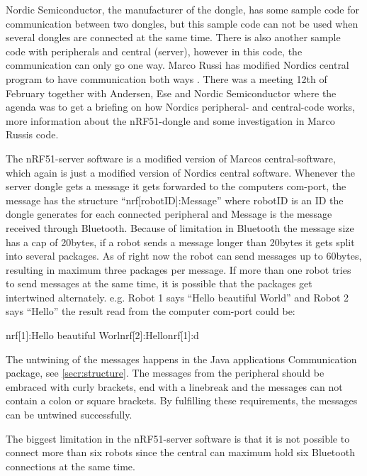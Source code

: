 Nordic Semiconductor, the manufacturer of the dongle, has some sample code for communication between two dongles, but this sample code can not be used when several dongles are connected at the same time. There is also another sample code with peripherals and central (server), however in this code, the communication can only go one way. Marco Russi has modified Nordics central program to have communication both ways \cite{marcoRussi}. There was a meeting 12th of February together with Andersen, Ese and Nordic Semiconductor where the agenda was to get a briefing on how Nordics peripheral- and central-code works, more information about the nRF51-dongle and some investigation in Marco Russis code.

The nRF51-server software is a modified version of Marcos central-software, which again is just a modified version of Nordics central software. Whenever the server dongle gets a message it gets forwarded to the computers \acrshort{com}-port, the message has the structure ``nrf[robotID]:Message'' where robotID is an ID the dongle generates for each connected peripheral and Message is the message received through Bluetooth. Because of limitation in Bluetooth the message size has a cap of 20bytes, if a robot sends a message longer than 20bytes it gets split into several packages. As of right now the robot can send messages up to 60bytes, resulting in maximum three packages per message. If more than one robot tries to send messages at the same time, it is possible that the packages get intertwined alternately. e.g. Robot 1 says ``Hello beautiful World'' and Robot 2 says ``Hello'' the result read from the computer \acrshort{com}-port could be: 

nrf[1]:Hello beautiful Worlnrf[2]:Hellonrf[1]:d

The untwining of the messages happens in the Java applications Communication package, see \ref{secr:structure}. The messages from the peripheral should be embraced with curly brackets, end with a linebreak and the messages can not contain a colon or square brackets. By fulfilling these requirements, the messages can be untwined successfully.

The biggest limitation in the nRF51-server software is that it is not possible to connect more than six robots since the central can maximum hold six Bluetooth connections at the same time.

